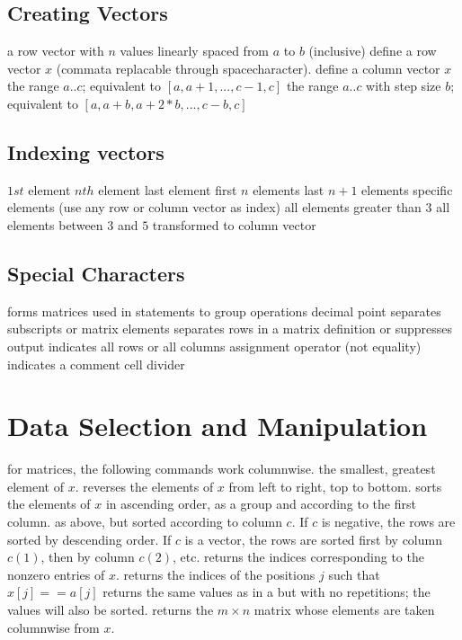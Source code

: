 \subsection{Creating Vectors}{}
	{a row vector with $n$ values linearly spaced from $a$ to $b$ (inclusive)}
	{define a row vector $x$ (commata replacable through spacecharacter).}
	{define a column vector $x$}
	{the range $a..c$; equivalent to $[a,a+1,...,c-1,c]$}
	{the range $a..c$ with step size $b$; equivalent to $[a,a+b,a+2*b,..., c-b,c]$ }

\subsection{Indexing vectors}{}
	{$1st$ element}
	{$nth$ element}
	{last element}
	{first $n$ elements}
	{last $n+1$ elements}
	{specific elements (use any row or column vector as index)}
	{all elements greater than $3$}
	{all elements between $3$ and $5$}
	{transformed to column vector}

\subsection{Special Characters}{}
\cmdOper{[]}	{forms matrices}
\cmdOper{()}	{used in statements to group operations}
	{decimal point}
\cmdOper{,! }	{separates subscripts or matrix elements}
\cmdOper{;}	{separates rows in a matrix definition or suppresses output}
\cmdOper{:}	{indicates all rows or all columns}
\cmdOper{=}	{assignment operator (not equality)}
\cmdOper{\%}	{indicates a comment}
\cmdOper{\%\%}	{cell divider}

\section{Data Selection and Manipulation}{for matrices, the following commands work columnwise.}
	{the smallest, greatest element of $x$.}
	{reverses the elements of $x$ from left to right, top to bottom.}
	{sorts the elements of $x$ in ascending order, as a group and according to the first column.}
	{as above, but sorted according to column $c$. If $c$
    is negative, the rows are sorted by descending order. If $c$ is a vector, the
    rows are sorted first by column $c(1)$, then by column $c(2)$, etc.}
	{returns the indices corresponding to the nonzero entries of $x$.}
	{returns the indices of the positions $j$ such that $x[j]==a[j]$}
	{returns the same values as in a but with no repetitions; the values will also be sorted.}
	{returns the $m  \times  n$ matrix whose elements are taken columnwise from $x$.}

